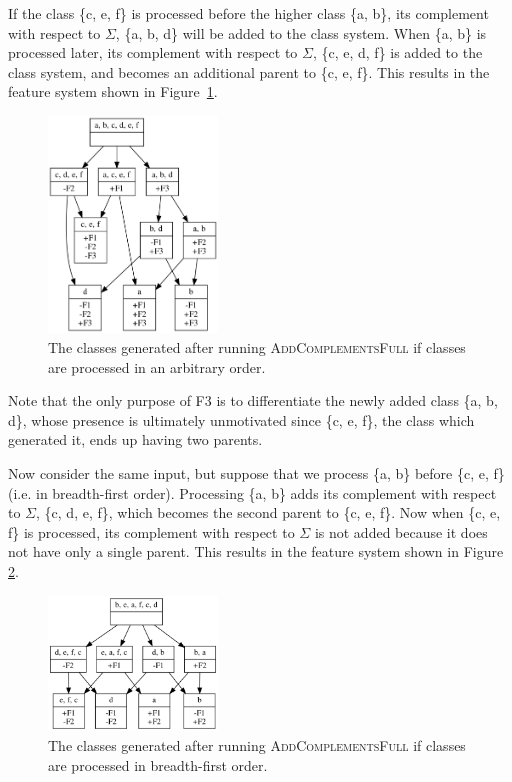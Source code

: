 \documentclass[11pt, oneside]{article}   	%
\begin{document}
If the class \{c, e, f\} is processed before the higher class \{a, b\}, its complement with respect to $\Sigma$, \{a, b, d\} will be added to the class system. When \{a, b\} is processed later, its complement with respect to $\Sigma$, \{c, e, d, f\} is added to the class system, and becomes an additional parent to \{c, e, f\}. This results in the feature system shown in Figure~\ref{fig:bfs1feats}.

\begin{figure}[htb!]
	\centering
	\includegraphics[width=0.4\textwidth]{bfs1_feats.png}
	\caption{The classes generated after running \textsc{AddComplementsFull} if classes are processed in an arbitrary order.}
	\label{fig:bfs1feats}
\end{figure}

Note that the only purpose of F3 is to differentiate the newly added class \{a, b, d\}, whose presence is ultimately unmotivated since \{c, e, f\}, the class which generated it, ends up having two parents.

Now consider the same input, but suppose that we process \{a, b\} before \{c, e, f\} (i.e. in breadth-first order). Processing \{a, b\} adds its complement with respect to $\Sigma$, \{c, d, e, f\}, which becomes the second parent to \{c, e, f\}. Now when \{c, e, f\} is processed, its complement with respect to $\Sigma$ is not added because it does not have only a single parent. This results in the feature system shown in Figure \ref{fig:bfs2feats}.

\begin{figure}[htb!]
	\centering
	\includegraphics[width=0.4\textwidth]{bfs2_feats.png}
	\caption{The classes generated after running \textsc{AddComplementsFull} if classes are processed in breadth-first order.}
	\label{fig:bfs2feats}
\end{figure}
\end{document}
